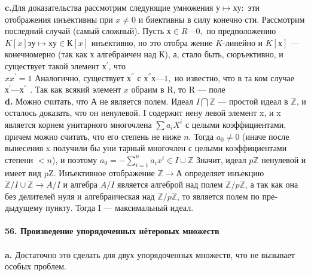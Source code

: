 \documentclass{../../template/mai_book}
\begin{document}
{{\hspace*{15pt}\textbf{c.}Для доказательства рассмотрим следующие умножения $у \mapsto ху:$\linebreak
эти отображения инъективны при $x \neq 0$ и биективны в силу конечно­\linebreak
сти. Рассмотрим последний случай (самый сложный). Пусть $х \in R —{0},$\linebreak
по предположению $K[x] э у \mapsto ху \in К[x]$ инъективно, но это отобра­\linebreak
жение $K$-линейно и $K[х]$ — конечномерно (так как х алгебраичен над\linebreak
К), а, стало быть, сюръективно, и существует такой элемент $х^{'}$, что\\
\newpage
\noindent $xx^{'} = 1 $ Аналогично, существует $х^{''}$ с $х^{''}х — 1,$ но известно, что в та­\linebreak
ком случае $х^{'} — х^{''}$ . Так как всякий элемент $x$ обраим в R, то R ---\linebreak
поле\\

\hspace*{15pt}\textbf{d.}  Можно считать, что А не является полем. Идеал $I\bigcap\mathbb{Z}$ — простой\linebreak
идеал в $\mathbb{Z}$, и осталось доказать, что он ненулевой. I содержит нену­\linebreak
левой элемент x, и x является корнем унитарного многочлена $\sum a_{i}X^{i}$\linebreak
с целыми коэффициентами, причем можно считать, что его степень\linebreak
не ниже $n$. Тогда $a_0 \neq 0$ (иначе после вынесения x получили бы уни­\linebreak
тарный многочлен с целыми коэффициентами степени $< n$), и поэтому\linebreak
$a_0 = - \sum^{n}_{i = 1}a_{i}x^{i} \in I \cup \mathbb{Z}$ Значит, идеал $p\mathbb{Z}$ ненулевой и имеет вид pZ.\linebreak
Инъективное отображение $\mathbb{Z} \rightarrow А$ определяет инъекцию $\mathbb{Z}/I\cup\mathbb{Z} \rightarrow A/I$\linebreak
и алгебра $A/I$ является алгеброй над полем $\mathbb{Z}/p\mathbb{Z}$, а так как она без\linebreak
делителей нуля и алгебраическая над $\mathbb{Z}/p\mathbb{Z}$, то является полем по пре­\linebreak
дыдущему пункту. Тогда I --- максимальный идеал.\\
\\
\noindent\textbf{56. Произведение упорядоченных нётеровых множеств}\\
\\
\hspace*{15pt}\textbf{a.} Достаточно это сделать для двух упорядоченных множеств, что\linebreak
не вызывает особых проблем.\\

}}
\end{document}

